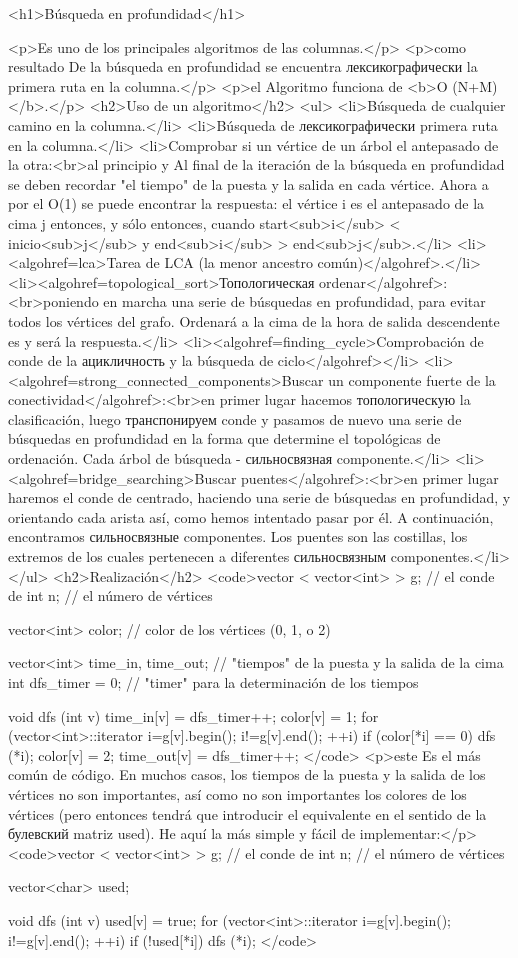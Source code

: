 <h1>Búsqueda en profundidad</h1>

<p>Es uno de los principales algoritmos de las columnas.</p>
<p>como resultado De la búsqueda en profundidad se encuentra лексикографически la primera ruta en la columna.</p>
<p>el Algoritmo funciona de <b>O (N+M)</b>.</p>
<h2>Uso de un algoritmo</h2>
<ul>
<li>Búsqueda de cualquier camino en la columna.</li>
<li>Búsqueda de лексикографически primera ruta en la columna.</li>
<li>Comprobar si un vértice de un árbol el antepasado de la otra:<br>al principio y Al final de la iteración de la búsqueda en profundidad se deben recordar "el tiempo" de la puesta y la salida en cada vértice. Ahora a por el O(1) se puede encontrar la respuesta: el vértice i es el antepasado de la cima j entonces, y sólo entonces, cuando start<sub>i</sub> < inicio<sub>j</sub> y end<sub>i</sub> > end<sub>j</sub>.</li>
<li><algohref=lca>Tarea de LCA (la menor ancestro común)</algohref>.</li>
<li><algohref=topological_sort>Топологическая ordenar</algohref>:<br>poniendo en marcha una serie de búsquedas en profundidad, para evitar todos los vértices del grafo. Ordenará a la cima de la hora de salida descendente es y será la respuesta.</li>
<li><algohref=finding_cycle>Comprobación de conde de la ацикличность y la búsqueda de ciclo</algohref></li>
<li><algohref=strong_connected_components>Buscar un componente fuerte de la conectividad</algohref>:<br>en primer lugar hacemos топологическую la clasificación, luego транспонируем conde y pasamos de nuevo una serie de búsquedas en profundidad en la forma que determine el topológicas de ordenación. Cada árbol de búsqueda - сильносвязная componente.</li>
<li><algohref=bridge_searching>Buscar puentes</algohref>:<br>en primer lugar haremos el conde de centrado, haciendo una serie de búsquedas en profundidad, y orientando cada arista así, como hemos intentado pasar por él. A continuación, encontramos сильносвязные componentes. Los puentes son las costillas, los extremos de los cuales pertenecen a diferentes сильносвязным componentes.</li>
</ul>
<h2>Realización</h2>
<code>vector < vector<int> > g; // el conde de
int n; // el número de vértices

vector<int> color; // color de los vértices (0, 1, o 2)

vector<int> time_in, time_out; // "tiempos" de la puesta y la salida de la cima
int dfs_timer = 0; // "timer" para la determinación de los tiempos

void dfs (int v) {
time_in[v] = dfs_timer++;
color[v] = 1;
for (vector<int>::iterator i=g[v].begin(); i!=g[v].end(); ++i)
if (color[*i] == 0)
dfs (*i);
color[v] = 2;
time_out[v] = dfs_timer++;
}</code>
<p>este Es el más común de código. En muchos casos, los tiempos de la puesta y la salida de los vértices no son importantes, así como no son importantes los colores de los vértices (pero entonces tendrá que introducir el equivalente en el sentido de la булевский matriz used). He aquí la más simple y fácil de implementar:</p>
<code>vector < vector<int> > g; // el conde de
int n; // el número de vértices

vector<char> used;

void dfs (int v) {
used[v] = true;
for (vector<int>::iterator i=g[v].begin(); i!=g[v].end(); ++i)
if (!used[*i])
dfs (*i);
}</code>
